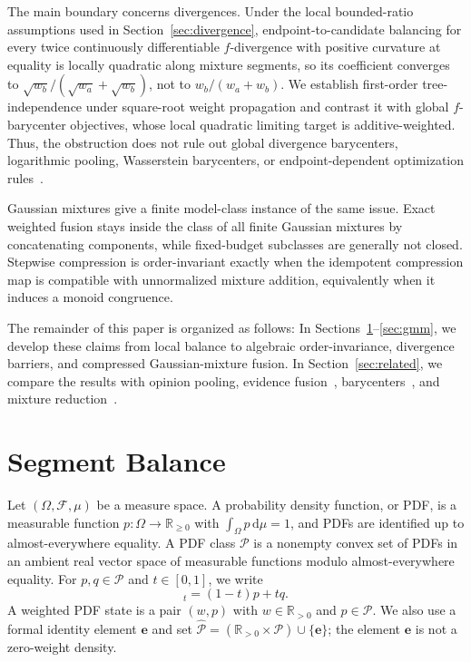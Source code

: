 \documentclass[runningheads]{llncs}
\newcommand{\R}{\mathbb{R}}
\newcommand{\Pcal}{\mathcal{P}}
\newcommand{\e}{\mathbf{e}}
\newcommand{\dd}{\,\mathrm{d}}
\begin{document}
The main boundary concerns divergences. Under the local bounded-ratio assumptions used in Section~\ref{sec:divergence}, endpoint-to-candidate balancing for every twice continuously differentiable $f$-divergence with positive curvature at equality is locally quadratic along mixture segments, so its coefficient converges to $\sqrt{w_b}/(\sqrt{w_a}+\sqrt{w_b})$, not to $w_b/(w_a+w_b)$. We establish first-order tree-independence under square-root weight propagation and contrast it with global $f$-barycenter objectives, whose local quadratic limiting target is additive-weighted. Thus, the obstruction does not rule out global divergence barycenters, logarithmic pooling, Wasserstein barycenters, or endpoint-dependent optimization rules~\cite{kullback1951information,ali1966general,csiszar1967information}.

Gaussian mixtures give a finite model-class instance of the same issue. Exact weighted fusion stays inside the class of all finite Gaussian mixtures by concatenating components, while fixed-budget subclasses are generally not closed. Stepwise compression is order-invariant exactly when the idempotent compression map is compatible with unnormalized mixture addition, equivalently when it induces a monoid congruence.

The remainder of this paper is organized as follows: In Sections~\ref{sec:balance}--\ref{sec:gmm}, we develop these claims from
local balance to algebraic order-invariance, divergence barriers, and compressed
Gaussian-mixture fusion. In Section~\ref{sec:related}, we compare the results
with opinion pooling, evidence fusion~\cite{shafer1976mathematical},
barycenters~\cite{agueh2011barycenters}, and mixture
reduction~\cite{dempster1977maximum}.

\section{Segment Balance}\label{sec:balance}
Let $(\Omega,\mathcal F,\mu)$ be a measure space. A probability density
function, or PDF, is a measurable function $p:\Omega\to\R_{\geq0}$ with
$\int_\Omega p\dd\mu=1$, and PDFs are identified up to almost-everywhere
equality. A PDF class $\Pcal$ is a nonempty convex set of PDFs in an ambient
real vector space of measurable functions modulo almost-everywhere equality.
For $p,q\in\Pcal$ and $t\in[0,1]$, we write
\begin{equation}
  [p,q]_t=(1-t)p+tq .
  \label{eq:segment}
\end{equation}
A weighted PDF state is a pair $(w,p)$ with $w\in\R_{>0}$ and
$p\in\Pcal$. We also use a formal identity element $\e$ and set
$\widehat{\Pcal}=(\R_{>0}\times\Pcal)\cup\{\e\}$; the element $\e$ is not a
zero-weight density.
\end{document}
